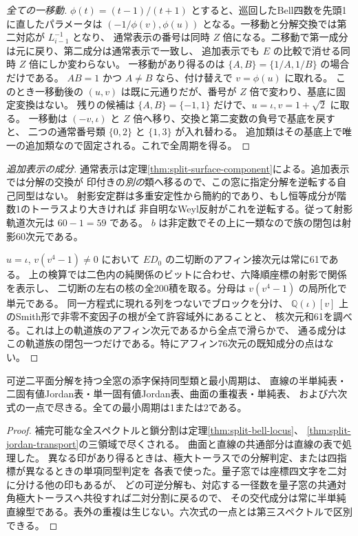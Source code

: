 \begin{proof}[全ての一移動]
$\phi(t)=(t-1)/(t+1)$ とすると、巡回したBell四数を先頭1に直したパラメータは
$(-1/\phi(v),\phi(u))$ となる。一移動と分解交換では第二対応が $L_{i-1}^{-1}$ となり、
通常表示の番号は同時 $Z$ 倍になる。二移動で第一成分は元に戻り、第二成分は通常表示で一致し、
追加表示でも $E$ の比較で消せる同時 $Z$ 倍にしか変わらない。
一移動があり得るのは $\{A,B\}=\{1/A,1/B\}$ の場合だけである。
$AB=1$ かつ $A\ne B$ なら、付け替えで $v=\phi(u)$ に取れる。
このとき一移動後の $(u,v)$ は既に元通りだが、番号が $Z$ 倍で変わり、基底に固定変換はない。
残りの候補は $\{A,B\}=\{-1,1\}$ だけで、$u=\iota,v=1+\sqrt2$ に取る。
一移動は $(-v,\iota)$ と $Z$ 倍へ移り、交換と第二変数の負号で基底を戻すと、
二つの通常番号類 $\{0,2\}$ と $\{1,3\}$ が入れ替わる。
追加類はその基底上で唯一の追加類なので固定される。これで全周期を得る。
\end{proof}

\begin{proof}[追加表示の成分]
通常表示は定理\ref{thm:split-surface-component}による。追加表示では分解の交換が
印付きの\emph{別の}類へ移るので、この窓に指定分解を逆転する自己同型はない。
射影安定群は多重安定性から簡約的であり、もし恒等成分が階数1のトーラスより大きければ
非自明なWeyl反射がこれを逆転する。従って射影軌道次元は $60-1=59$ である。
$b$ は非定数でその上に一類なので族の閉包は射影60次元である。

$u=\iota$, $v(v^4-1)\ne0$ において $ED_0$ の二切断のアフィン接次元は常に61である。
上の検算では二色内の純関係のビットに合わせ、六降順座標の射影で関係を表示し、
二切断の左右の核の全200積を取る。分母は $v(v^4-1)$ の局所化で単元である。
同一方程式に現れる列をつないでブロックを分け、
$\mathbb Q(\iota)[v]$ 上のSmith形で非零不変因子の根が全て許容域外にあることと、
核次元和61を調べる。これは上の軌道族のアフィン次元であるから全点で滑らかで、
通る成分はこの軌道族の閉包一つだけである。特にアフィン76次元の既知成分の点はない。
\end{proof}

\begin{corollary}\label{cor:all-invertible-split-atlas}
可逆二平面分解を持つ全窓の添字保持同型類と最小周期は、
直線の半単純表・二固有値Jordan表・単一固有値Jordan表、曲面の重複表・単純表、
および六次式の一点で尽きる。全ての最小周期は1または2である。
\end{corollary}
\begin{proof}
補完可能な全スペクトルと鎖分割は定理\ref{thm:split-bell-locus}、
\ref{thm:split-jordan-transport}の三領域で尽くされる。
曲面と直線の共通部分は直線の表で処理した。
異なる印があり得るときは、極大トーラスでの分解判定、または四指標が異なるときの単項同型判定を
各表で使った。量子窓では座標四文字を二対に分ける他の印もあるが、
どの可逆分解も、対応する一径数を量子窓の共通対角極大トーラスへ共役すれば二対分割に戻るので、
その交代成分は常に半単純直線型である。表外の重複は生じない。六次式の一点とは第三スペクトルで区別できる。
\end{proof}
